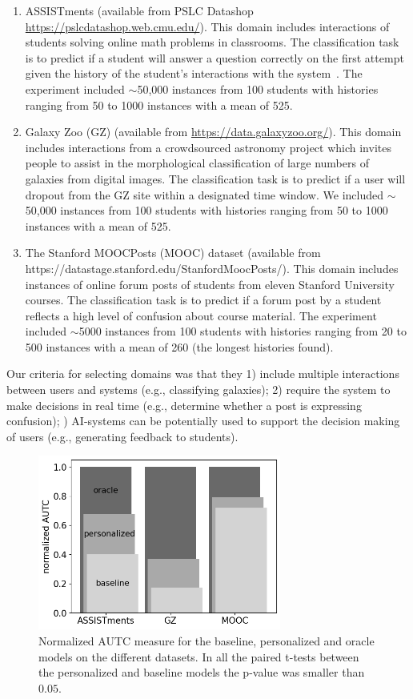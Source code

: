 \documentclass[letterpaper]{article} %
\theoremstyle{definition}
\newcommand{\kibitz}[2]{\ifnum\Comments=1{\color{#1}{#2}}\fi}
\newcommand{\li}[1]{\kibitz{brown}{[LL:#1]}}
\begin{document}
\begin{enumerate}
\item   ASSISTments (available from PSLC Datashop \url{https://pslcdatashop.web.cmu.edu/}). This domain
includes interactions of students  solving online math problems in classrooms. The classification task is to predict if a student will answer a question  correctly on the first attempt given the history of the student's interactions with the system~\cite{feng2006addressing}.
The experiment included $\sim$50,000 instances from 100 students with histories ranging from 50 to 1000 instances with a mean of 525.

\item   Galaxy Zoo  (GZ)    (available from \url{https://data.galaxyzoo.org/}). This domain includes interactions from a crowdsourced astronomy project which invites people to assist in the morphological classification of large numbers of galaxies from digital images.  The classification task is to predict if a user
will dropout from the GZ site within a designated time window. We included $\sim$50,000 instances from 100 students with histories ranging from 50 to 1000 instances with a mean of 525.


\item The Stanford MOOCPosts (MOOC) dataset (available from https://datastage.stanford.edu/StanfordMoocPosts/). This domain  includes instances of   online forum posts of students from eleven Stanford University   courses. The  classification task is to predict if a forum post by a student reflects a high level of confusion about course material. The experiment included $\sim$5000 instances from 100 students with histories ranging from 20 to 500 instances with a mean of 260 (the longest histories found).

\end{enumerate}
Our criteria for selecting domains was that they 1) include multiple interactions between users and systems (e.g., classifying galaxies); 2) require  the system to make decisions in real time (e.g., determine whether a post is expressing confusion); \li{In this example the system is making decisions in real time, not the user. Maybe you meant that the system has to make decisions in real time?} 3) AI-systems can be potentially used to support the decision making of users (e.g., generating feedback to students).
\begin{figure}[t]
\centering
\includegraphics[width=8cm]{bar_graph}
\caption{Normalized AUTC measure for the baseline, personalized and oracle models on the different datasets. In all the paired t-tests between the personalized and baseline models the p-value was smaller than $0.05$.}
\label{fig:bar_graph}
\end{figure}
\end{document}
